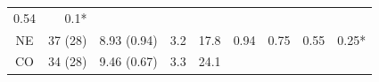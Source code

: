 \documentclass[fleqn,10pt,lineno]{wlpeerj} %
\theoremstyle{definition}
\theoremstyle{definition}
\theoremstyle{definition}
\theoremstyle{remark}
\begin{document}
\begin{longtable}[]{@{}crrrrllrl@{}}
\begin{minipage}[t]{0.06\columnwidth}
0.54\strut
\end{minipage} & \begin{minipage}[t]{0.07\columnwidth}\raggedright\strut
0.1*\strut
\end{minipage}\tabularnewline
\begin{minipage}[t]{0.12\columnwidth}\centering\strut
NE\strut
\end{minipage} & \begin{minipage}[t]{0.08\columnwidth}\raggedleft\strut
37 (28)\strut
\end{minipage} & \begin{minipage}[t]{0.13\columnwidth}\raggedleft\strut
8.93 (0.94)\strut
\end{minipage} & \begin{minipage}[t]{0.04\columnwidth}\raggedleft\strut
3.2\strut
\end{minipage} & \begin{minipage}[t]{0.05\columnwidth}\raggedleft\strut
17.8\strut
\end{minipage} & \begin{minipage}[t]{0.11\columnwidth}\raggedright\strut
0.94\strut
\end{minipage} & \begin{minipage}[t]{0.06\columnwidth}\raggedright\strut
0.75\strut
\end{minipage} & \begin{minipage}[t]{0.06\columnwidth}\raggedleft\strut
0.55\strut
\end{minipage} & \begin{minipage}[t]{0.07\columnwidth}\raggedright\strut
0.25*\strut
\end{minipage}\tabularnewline
\begin{minipage}[t]{0.12\columnwidth}\centering\strut
CO\strut
\end{minipage} & \begin{minipage}[t]{0.08\columnwidth}\raggedleft\strut
34 (28)\strut
\end{minipage} & \begin{minipage}[t]{0.13\columnwidth}\raggedleft\strut
9.46 (0.67)\strut
\end{minipage} & \begin{minipage}[t]{0.04\columnwidth}\raggedleft\strut
3.3\strut
\end{minipage} & \begin{minipage}[t]{0.05\columnwidth}\raggedleft\strut
24.1\strut
\end{minipage} & \begin{minipage}[t]{0.11\columnwidth}\raggedright\strut

\end{minipage}
\end{longtable}
\end{document}
